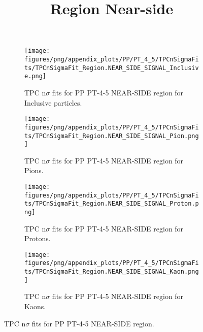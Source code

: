             \begin{figure}[H]
                \title{Region Near-side}
                \begin{subfigure}[b]{0.5\textwidth}
                    \centering
                    \texttt{[image: figures/png/appendix\_plots/PP/PT\_4\_5/TPCnSigmaFits/TPCnSigmaFit\_Region.NEAR\_SIDE\_SIGNAL\_Inclusive.png]}
                    \caption{TPC n$\sigma$ fits for PP PT-4-5 NEAR-SIDE region for Inclusive particles.}
                    \label{fig:appendix_PP_PT-4-5_NEAR_SIDE_SIGNAL_Inclusive}
                \end{subfigure}
                \begin{subfigure}[b]{0.5\textwidth}
                    \centering
                    \texttt{[image: figures/png/appendix\_plots/PP/PT\_4\_5/TPCnSigmaFits/TPCnSigmaFit\_Region.NEAR\_SIDE\_SIGNAL\_Pion.png]}
                    \caption{TPC n$\sigma$ fits for PP PT-4-5 NEAR-SIDE region for Pions.}
                    \label{fig:appendix_PP_PT-4-5_NEAR_SIDE_SIGNAL_Pion}
                \end{subfigure}
                \begin{subfigure}[b]{0.5\textwidth}
                    \centering
                    \texttt{[image: figures/png/appendix\_plots/PP/PT\_4\_5/TPCnSigmaFits/TPCnSigmaFit\_Region.NEAR\_SIDE\_SIGNAL\_Proton.png]}
                    \caption{TPC n$\sigma$ fits for PP PT-4-5 NEAR-SIDE region for Protons.}
                    \label{fig:appendix_PP_PT-4-5_NEAR_SIDE_SIGNAL_Proton}
                \end{subfigure}
                \begin{subfigure}[b]{0.5\textwidth}
                    \centering
                    \texttt{[image: figures/png/appendix\_plots/PP/PT\_4\_5/TPCnSigmaFits/TPCnSigmaFit\_Region.NEAR\_SIDE\_SIGNAL\_Kaon.png]}
                    \caption{TPC n$\sigma$ fits for PP PT-4-5 NEAR-SIDE region for Kaons.}
                    \label{fig:appendix_PP_PT-4-5_NEAR_SIDE_SIGNAL_Kaon}
                \end{subfigure}
                \caption{TPC n$\sigma$ fits for PP PT-4-5 NEAR-SIDE region.}
                \label{fig:appendix_PP_PT-4-5_NEAR_SIDE_SIGNAL}
            \end{figure}
